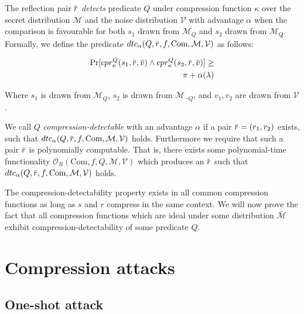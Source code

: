 \documentclass[conference, letterpaper, 10pt]{IEEEtran}
\newcommand{\overbar}[1]{\mkern 1.5mu\overline{\mkern-1.5mu#1\mkern-1.5mu}\mkern 1.5mu}
\begin{document}
The reflection pair $\overbar{r}$ \textit{detects} predicate $Q$ under
compression function $\kappa$ over the secret distribution $\mathcal{M}$ and
the noise distribution $\mathcal{V}$ with advantage $\alpha$ when the
comparison is favourable for both $s_1$ drawn from $\mathcal{M}_Q$ and $s_2$
drawn from $\mathcal{M}_{\not Q}$. Formally, we define the predicate
$dtc_\alpha(Q, \overbar{r}, f, \textrm{Com}, \mathcal{M}, \mathcal{V})$ as follows:

\begin{align*}
    \Pr
        [cpr^Q_{\kappa}(s_1, \overbar{r}, \overbar{v}) \land
         cpr^Q_{\kappa}(s_2, \overbar{r}, \overbar{v})]
    \geq\\
    \pi + \alpha(\lambda)
\end{align*}

Where $s_1$ is drawn from $\mathcal{M}_Q$, $s_2$ is drawn from
$\mathcal{M}_{\lnot Q}$, and $v_1, v_2$ are drawn from $\mathcal{V}$.

We call $Q$ \textit{compression-detectable} with an advantage $\alpha$ if a
pair $\overbar{r} = (r_1, r_2)$ exists, such that $dtc_\alpha(Q, \overbar{r},
f, \textrm{Com}, \mathcal{M}, \mathcal{V})$ holds. Furthermore we require that such a
pair $\overbar{r}$ is polynomially computable. That is, there exists some
polynomial-time functionality $\mathcal{O}_R(\textrm{Com}, f, Q, \mathcal{M},
\mathcal{V})$ which produces an $\overbar{r}$ such that $dtc_\alpha(Q,
\overbar{r}, f, \textrm{Com}, \mathcal{M}, \mathcal{V})$ holds.

The compression-detectability property exists in all common compression
functions as long as $s$ and $r$ compress in the same context. We will now
prove the fact that all compression functions which are ideal under some
distribution $\bar{\mathcal{M}}$ exhibit compression-detectability of some
predicate $Q$.

\section{Compression attacks}\label{sec:comattack}

\subsection{One-shot attack}
\end{document}
